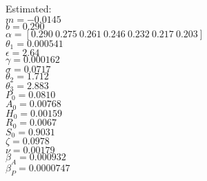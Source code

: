 \documentclass[12pt]{article}
\begin{document}
\begin{multicols}{2}
Estimated: \\
$m=-0.0145$ \\
$b=0.290$\\
$\alpha=[0.290  \   0.275  \   0.261    \   0.246 \    0.232    \     0.217  \  0.203  ]$ \\
$\theta_1=0.000541 $\\
$\epsilon=2.64$ \\
\textbf{$\gamma=0.000162$}\\
$\sigma=0.0717$ \\
$\theta_2=1.712$  \\
$\theta_3=2.883$ \\
$P_0=0.0810$ \\
$A_0=0.00768$ \\
$H_0=0.00159$ \\
$R_0=0.0067$ \\
$S_0=0.9031$ \\
$\zeta=0.0978$ \\
$\nu=0.00179$ \\ 
$\beta_A=0.000932$ \\
$\beta_P=0.0000747$ \\
\end{multicols}
\end{document}
